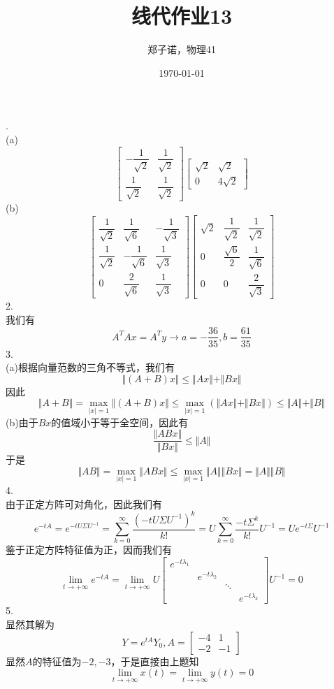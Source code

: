 \documentclass[utf8]{ctexart}
\title{线代作业13}
\author{郑子诺，物理41}
\date{\today}
\begin{document}
\maketitle
{}.\\
(a)\[\begin{bmatrix}
	-\dfrac{1}{\sqrt{2}}&\dfrac{1}{\sqrt{2}}\\[8pt]
	\dfrac{1}{\sqrt{2}}&\dfrac{1}{\sqrt{2}}
\end{bmatrix}\begin{bmatrix}
\sqrt{2}&\sqrt{2}\\
0&4\sqrt{2}
\end{bmatrix}\]
(b)
\[\begin{bmatrix}
	\dfrac{1}{\sqrt{2}}&\dfrac{1}{\sqrt{6}}&-\dfrac{1}{\sqrt{3}}\\[8pt]
	\dfrac{1}{\sqrt{2}}&-\dfrac{1}{\sqrt{6}}&\dfrac{1}{\sqrt{3}}\\[8pt]
	0&\dfrac{2}{\sqrt{6}}&\dfrac{1}{\sqrt{3}}
\end{bmatrix}\begin{bmatrix}
\sqrt{2}&\dfrac{1}{\sqrt{2}}&\dfrac{1}{\sqrt{2}}\\[8pt]
0&\dfrac{\sqrt{6}}{2}&\dfrac{1}{\sqrt{6}}\\[8pt]
0&0&\dfrac{2}{\sqrt{3}}
\end{bmatrix}\]
2.\\
我们有
\[A^TAx=A^Ty\rightarrow a=-\frac{36}{35},b=\frac{61}{35}\]
3.\\
(a)根据向量范数的三角不等式，我们有
\[\Vert(A+B)x\Vert\le\Vert Ax\Vert+\Vert Bx\Vert\]
因此
\[\Vert A+B\Vert=\max_{|x|=1}\Vert (A+B)x\Vert\le\max_{|x|=1}(\Vert Ax\Vert+\Vert Bx\Vert)\le\Vert A\Vert+\Vert B\Vert\]
(b)由于$Bx$的值域小于等于全空间，因此有
\[\frac{\Vert ABx\Vert}{\Vert Bx\Vert}\le\Vert A\Vert\]
于是
\[\Vert AB\Vert=\max_{|x|=1}\Vert ABx\Vert\le\max_{|x|=1}\Vert A\Vert\Vert Bx\Vert=\Vert A\Vert\Vert B\Vert\]
4.\\
由于正定方阵可对角化，因此我们有
\[e^{-tA}=e^{-tU\Sigma U^{-1}}=\sum_{k=0}^\infty\frac{(-tU\Sigma U^{-1})^k}{k!}=U\sum_{k=0}^\infty\frac{-t\Sigma^k}{k!}U^{-1}=Ue^{-t\Sigma}U^{-1}\]
鉴于正定方阵特征值为正，因而我们有
\[\lim_{t\rightarrow+\infty}e^{-tA}=\lim_{t\rightarrow+\infty}U\begin{bmatrix}
	e^{-t\lambda_1}&&&\\
	&e^{-t\lambda_2}&&\\
	&&\ddots&\\
	&&&e^{-t\lambda_k}
\end{bmatrix}U^{-1}=0\]
5.\\
显然其解为
\[Y=e^{tA}Y_0,A=\begin{bmatrix}
	-4&1\\
	-2&-1
\end{bmatrix}\]
显然$A$的特征值为$-2,-3$，于是直接由上题知
\[\lim_{t\rightarrow+\infty}x(t)=\lim_{t\rightarrow+\infty}y(t)=0\]
\end{document}
